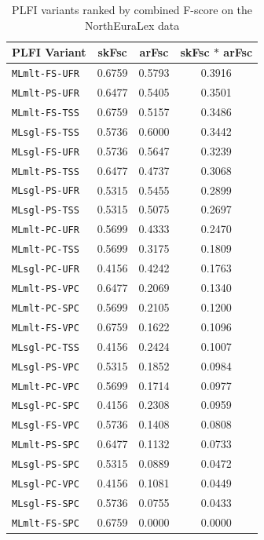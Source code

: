 \begin{table}[t]
 \centering
 \begin{tabular}{lccc}
 \hline \hline
PLFI Variant & skFsc & arFsc & skFsc $\ast$ arFsc\\ \hline
\texttt{MLmlt-FS-UFR} & 0.6759 & 0.5793 & 0.3916\\
\texttt{MLmlt-PS-UFR} & 0.6477 & 0.5405 & 0.3501\\
\texttt{MLmlt-FS-TSS} & 0.6759 & 0.5157 & 0.3486\\
\texttt{MLsgl-FS-TSS} & 0.5736 & 0.6000 & 0.3442\\
\texttt{MLsgl-FS-UFR} & 0.5736 & 0.5647 & 0.3239\\
\texttt{MLmlt-PS-TSS} & 0.6477 & 0.4737 & 0.3068\\
\texttt{MLsgl-PS-UFR} & 0.5315 & 0.5455 & 0.2899\\
\texttt{MLsgl-PS-TSS} & 0.5315 & 0.5075 & 0.2697\\
\texttt{MLmlt-PC-UFR} & 0.5699 & 0.4333 & 0.2470\\
\texttt{MLmlt-PC-TSS} & 0.5699 & 0.3175 & 0.1809\\
\texttt{MLsgl-PC-UFR} & 0.4156 & 0.4242 & 0.1763\\
\texttt{MLmlt-PS-VPC} & 0.6477 & 0.2069 & 0.1340\\
\texttt{MLmlt-PC-SPC} & 0.5699 & 0.2105 & 0.1200\\
\texttt{MLmlt-FS-VPC} & 0.6759 & 0.1622 & 0.1096\\
\texttt{MLsgl-PC-TSS} & 0.4156 & 0.2424 & 0.1007\\
\texttt{MLsgl-PS-VPC} & 0.5315 & 0.1852 & 0.0984\\
\texttt{MLmlt-PC-VPC} & 0.5699 & 0.1714 & 0.0977\\
\texttt{MLsgl-PC-SPC} & 0.4156 & 0.2308 & 0.0959\\
\texttt{MLsgl-FS-VPC} & 0.5736 & 0.1408 & 0.0808\\
\texttt{MLmlt-PS-SPC} & 0.6477 & 0.1132 & 0.0733\\
\texttt{MLsgl-PS-SPC} & 0.5315 & 0.0889 & 0.0472\\
\texttt{MLsgl-PC-VPC} & 0.4156 & 0.1081 & 0.0449\\
\texttt{MLsgl-FS-SPC} & 0.5736 & 0.0755 & 0.0433\\
\texttt{MLmlt-FS-SPC} & 0.6759 & 0.0000 & 0.0000\\
  \hline
 \end{tabular}
 \caption{PLFI variants ranked by combined F-score on the NorthEuraLex data}
 \label{variant-comparison-nelex}
\end{table}


